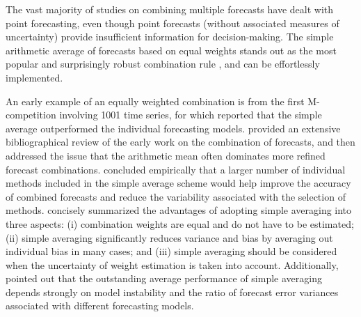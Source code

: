 \documentclass[a4paper,11pt]{article}
\begin{document}
The vast majority of studies on combining multiple forecasts have dealt with point forecasting, even though point forecasts (without associated measures of uncertainty) provide insufficient information for decision-making. The simple arithmetic average of forecasts based on equal weights stands out as the most popular and surprisingly robust combination rule \citep[see][]{Bunn1985-vo,Clemen1986-pd,Stock2003-sp,Genre2013-ut}, and can be effortlessly implemented.

An early example of an equally weighted combination is from the first M-competition involving 1001 time series, for which \citet{Makridakis1982-hb} reported that the simple average outperformed the individual forecasting models. \citet{Clemen1989-fb} provided an extensive bibliographical review of the early work on the combination of forecasts, and then addressed the issue that the arithmetic mean often dominates more refined forecast combinations. \citet{Makridakis1983-hg} concluded empirically that a larger number of individual methods included in the simple average scheme would help improve the accuracy of combined forecasts and reduce the variability associated with the selection of methods. \citet{Palm1992-im} concisely summarized the advantages of adopting simple averaging into three aspects: (i) combination weights are equal and do not have to be estimated; (ii) simple averaging significantly reduces variance and bias by averaging out individual bias in many cases; and (iii) simple averaging should be considered when the uncertainty of weight estimation is taken into account. Additionally, \citet{Timmermann2006-en} pointed out that the outstanding average performance of simple averaging depends strongly on model instability and the ratio of forecast error variances associated with different forecasting models.
\end{document}
